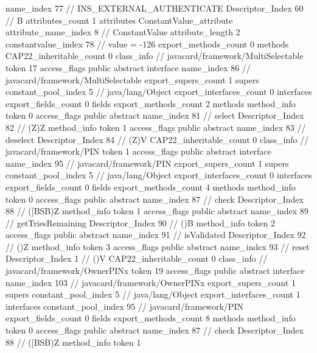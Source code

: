 {{{{{				name_index	77		// INS_EXTERNAL_AUTHENTICATE
				Descriptor_Index	60		// B
				attributes_count	1
				attributes {
				ConstantValue_attribute {
					attribute_name_index	8		// ConstantValue
					attribute_length	2
					constantvalue_index	78		// value = -126
				}
				}
			}
			}
			export_methods_count	0
			methods {
			}
			CAP22_inheritable_count	0
		}
		class_info {		// javacard/framework/MultiSelectable
			token	17
			access_flags	public abstract interface
			name_index	86		// javacard/framework/MultiSelectable
			export_supers_count	1
			supers {
				constant_pool_index	5		// java/lang/Object
			}
			export_interfaces_count	0
			interfaces {
			}
			export_fields_count	0
			fields {
			}
			export_methods_count	2
			methods {
				method_info {
					token	0
					access_flags	public abstract
					name_index	81		// select
					Descriptor_Index	82		// (Z)Z
				}
				method_info {
					token	1
					access_flags	public abstract
					name_index	83		// deselect
					Descriptor_Index	84		// (Z)V
				}
			}
			CAP22_inheritable_count	0
		}
		class_info {		// javacard/framework/PIN
			token	1
			access_flags	public abstract interface
			name_index	95		// javacard/framework/PIN
			export_supers_count	1
			supers {
				constant_pool_index	5		// java/lang/Object
			}
			export_interfaces_count	0
			interfaces {
			}
			export_fields_count	0
			fields {
			}
			export_methods_count	4
			methods {
				method_info {
					token	0
					access_flags	public abstract
					name_index	87		// check
					Descriptor_Index	88		// ([BSB)Z
				}
				method_info {
					token	1
					access_flags	public abstract
					name_index	89		// getTriesRemaining
					Descriptor_Index	90		// ()B
				}
				method_info {
					token	2
					access_flags	public abstract
					name_index	91		// isValidated
					Descriptor_Index	92		// ()Z
				}
				method_info {
					token	3
					access_flags	public abstract
					name_index	93		// reset
					Descriptor_Index	1		// ()V
				}
			}
			CAP22_inheritable_count	0
		}
		class_info {		// javacard/framework/OwnerPINx
			token	19
			access_flags	public abstract interface
			name_index	103		// javacard/framework/OwnerPINx
			export_supers_count	1
			supers {
				constant_pool_index	5		// java/lang/Object
			}
			export_interfaces_count	1
			interfaces {
				constant_pool_index	95		// javacard/framework/PIN
			}
			export_fields_count	0
			fields {
			}
			export_methods_count	8
			methods {
				method_info {
					token	0
					access_flags	public abstract
					name_index	87		// check
					Descriptor_Index	88		// ([BSB)Z
				}
				method_info {
					token	1
}}}}}

